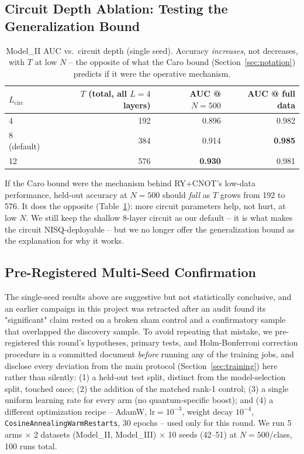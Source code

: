 \documentclass[10pt,letterpaper]{article}
\theoremstyle{plain}
\theoremstyle{definition}
\newcommand{\win}[1]{\textcolor{good}{\textbf{#1}}}
\begin{document}
\subsection{Circuit Depth Ablation: Testing the Generalization Bound}
\label{sec:depth}

\begin{table}[h]
\centering\small
\begin{tabular}{@{}lrrr@{}}
\toprule
$L_\mathrm{circ}$ & $T$ (total, all $L{=}4$ layers) & AUC @ $N{=}500$ & AUC @ full data \\
\midrule
4 & 192 & 0.896 & 0.982 \\
8 (default) & 384 & 0.914 & \win{0.985} \\
12 & 576 & \win{0.930} & 0.981 \\
\bottomrule
\end{tabular}
\caption{Model\_II AUC vs.\ circuit depth (single seed). Accuracy
\emph{increases}, not decreases, with $T$ at low $N$ -- the opposite of
what the Caro bound (Section~\ref{sec:notation}) predicts if it were the
operative mechanism.}
\label{tab:depth}
\end{table}

If the Caro bound were the mechanism behind RY+CNOT's low-data performance,
held-out accuracy at $N{=}500$ should \emph{fall} as $T$ grows from 192 to
576. It does the opposite (Table~\ref{tab:depth}): more circuit parameters
help, not hurt, at low $N$. We still keep the shallow 8-layer circuit as
our default -- it is what makes the circuit NISQ-deployable -- but we no
longer offer the generalization bound as the explanation for why it works.

\subsection{Pre-Registered Multi-Seed Confirmation}
\label{sec:prereg}

The single-seed results above are suggestive but not statistically
conclusive, and an earlier campaign in this project was retracted after an
audit found its "significant" claim rested on a broken sham control and a
confirmatory sample that overlapped the discovery sample. To avoid
repeating that mistake, we pre-registered this round's hypotheses, primary
tests, and Holm-Bonferroni correction procedure in a committed document
\emph{before} running any of the training jobs, and disclose every
deviation from the main protocol (Section~\ref{sec:training}) here rather
than silently: (1) a held-out test split, distinct from the
model-selection split, touched once; (2) the addition of the matched
rank-1 control; (3) a single uniform learning rate for every arm (no
quantum-specific boost); and (4) a different optimization recipe --
AdamW, $\mathrm{lr}{=}10^{-3}$, weight decay $10^{-4}$,
\texttt{CosineAnnealingWarmRestarts}, 30 epochs -- used only for this round.
We run 5 arms $\times$ 2 datasets (Model\_II, Model\_III) $\times$ 10 seeds
(42--51) at $N{=}500$/class, 100 runs total.
\end{document}

